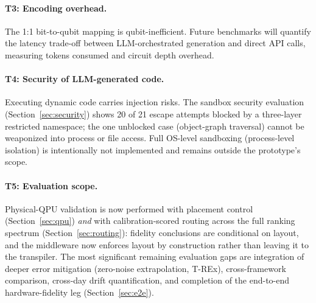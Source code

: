 ﻿\documentclass[12pt,a4paper]{article}
\begin{document}
\paragraph{T3: Encoding overhead.} The 1:1 bit-to-qubit mapping is qubit-inefficient. Future benchmarks will quantify the latency trade-off between LLM-orchestrated generation and direct API calls, measuring tokens consumed and circuit depth overhead.

\paragraph{T4: Security of LLM-generated code.} Executing dynamic code carries injection risks. The sandbox security evaluation (Section~\ref{sec:security}) shows 20 of 21 escape attempts blocked by a three-layer restricted namespace; the one unblocked case (object-graph traversal) cannot be weaponized into process or file access. Full OS-level sandboxing (process-level isolation) is intentionally not implemented and remains outside the prototype's scope.

\paragraph{T5: Evaluation scope.} Physical-QPU validation is now performed with placement control (Section~\ref{sec:qpu}) \emph{and} with calibration-scored routing across the full ranking spectrum (Section~\ref{sec:routing}): fidelity conclusions are conditional on layout, and the middleware now enforces layout by construction rather than leaving it to the transpiler. The most significant remaining evaluation gaps are integration of deeper error mitigation (zero-noise extrapolation, T-REx), cross-framework comparison, cross-day drift quantification, and completion of the end-to-end hardware-fidelity leg (Section~\ref{sec:e2e}).
\end{document}
